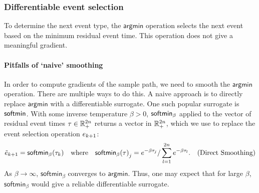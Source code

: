 


\subsubsection{Differentiable event selection}

To determine the next event type, the $\mathsf{argmin}$ operation selects the next event based on the minimum residual event time. This operation does not give a meaningful gradient.

\paragraph{Pitfalls of `naive' smoothing}
In order to compute gradients of the sample path, we need to smooth the $\mathsf{argmin}$ operation. There are multiple ways to do this. A naive approach is to directly replace $\mathsf{argmin}$ with a differentiable surrogate. %
One such popular surrogate is $\mathsf{softmin}$. With some inverse temperature $\beta > 0$, $\mathsf{softmin}_\beta$ applied to the vector of residual event times $\tau \in \mathbb{R}_{+}^{2n}$ returns a vector in $\mathbb{R}_{+}^{2n}$, 
which we use to replace the event selection operation $e_{k+1}$: 
\begin{equation}
\label{eq:direct_smoothing}
\tilde{e}_{k+1} = \mathsf{softmin}_{\beta}(\tau_{k})
~~~\mbox{where}~~~\mathsf{softmin_{\beta}(\tau)}_{j}=e^{-\beta \tau_{j}} / \sum_{l=1}^{2n} e^{-\beta \tau_{l}}.
\hspace{-1em}
\tag{Direct Smoothing}
\end{equation}
As $\beta \to \infty$, $\mathsf{softmin}_{\beta}$ converges to $\mathsf{argmin}$. Thus, one may expect that for large $\beta$, $\mathsf{softmin}_{\beta}$ would give a reliable differentiable surrogate. 

